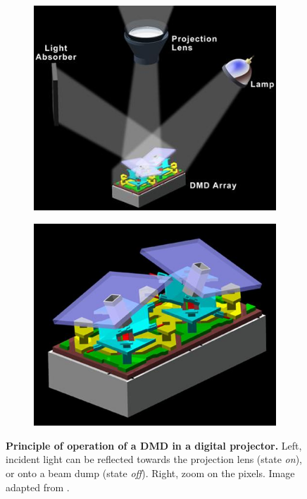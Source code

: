 \documentclass[12pt]{iopart}
\begin{document}
\begin{figure}
\centering
\begin{subfigure}{0.49\textwidth}
\centering
\includegraphics[width = \textwidth]{images/pixel_1.jpg}
\label{fig:pix_left}
\end{subfigure}
\begin{subfigure}{0.49\textwidth}
\centering
\includegraphics[width = \textwidth]{images/pixel_2.jpg}
\label{fig:pix_right}
\end{subfigure}
\caption{
\textbf{Principle of operation of a DMD in a digital projector.}
Left, incident light can be reflected towards the projection lens (state {\em on}), 
or onto a beam dump (state {\em off}).
Right, zoom on the pixels. 
Image adapted from \cite{JacksonDMD}.
}
\label{fig:combined_pixel}
\end{figure}
\end{document}
